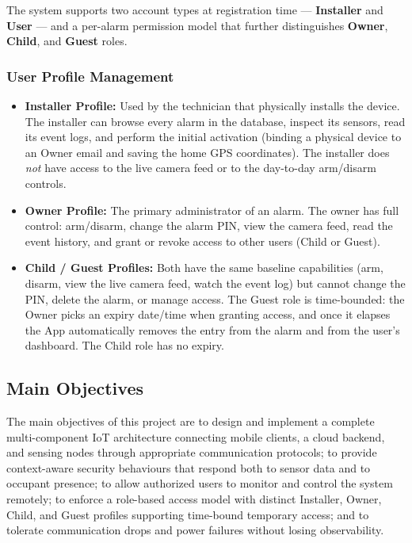 \documentclass[10pt,twocolumn]{article}
\begin{document}
The system supports two account types at registration time --- \textbf{Installer} and \textbf{User} --- and a per-alarm permission model that further distinguishes \textbf{Owner}, \textbf{Child}, and \textbf{Guest} roles.

\subsubsection{User Profile Management}
\begin{itemize}
    \item \textbf{Installer Profile:} Used by the technician that physically installs the device. The installer can browse every alarm in the database, inspect its sensors, read its event logs, and perform the initial activation (binding a physical device to an Owner email and saving the home GPS coordinates). The installer does \emph{not} have access to the live camera feed or to the day-to-day arm/disarm controls.
    \item \textbf{Owner Profile:} The primary administrator of an alarm. The owner has full control: arm/disarm, change the alarm PIN, view the camera feed, read the event history, and grant or revoke access to other users (Child or Guest).
    \item \textbf{Child / Guest Profiles:} Both have the same baseline capabilities (arm, disarm, view the live camera feed, watch the event log) but cannot change the PIN, delete the alarm, or manage access. The Guest role is time-bounded: the Owner picks an expiry date/time when granting access, and once it elapses the App automatically removes the entry from the alarm and from the user's dashboard. The Child role has no expiry.
\end{itemize}

\subsection{Main Objectives}
The main objectives of this project are to design and implement a complete multi-component IoT architecture connecting mobile clients, a cloud backend, and sensing nodes through appropriate communication protocols; to provide context-aware security behaviours that respond both to sensor data and to occupant presence; to allow authorized users to monitor and control the system remotely; to enforce a role-based access model with distinct Installer, Owner, Child, and Guest profiles supporting time-bound temporary access; and to tolerate communication drops and power failures without losing observability.
\end{document}
